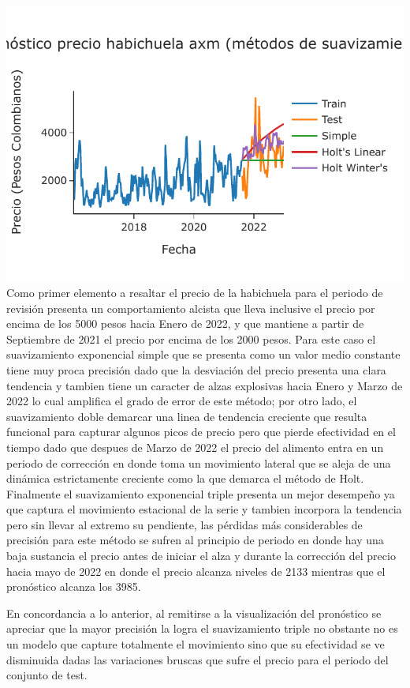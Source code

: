 \documentclass[
]{book}
\begin{document}
\includegraphics{bookdown-demo_files/figure-latex/unnamed-chunk-136-123.pdf}
Como primer elemento a resaltar el precio de la habichuela para el periodo de revisión presenta un comportamiento alcista que lleva inclusive el precio por encima de los 5000 pesos hacia Enero de 2022, y que mantiene a partir de Septiembre de 2021 el precio por encima de los 2000 pesos. Para este caso el suavizamiento exponencial simple que se presenta como un valor medio constante tiene muy proca precisión dado que la desviación del precio presenta una clara tendencia y tambien tiene un caracter de alzas explosivas hacia Enero y Marzo de 2022 lo cual amplifica el grado de error de este método; por otro lado, el suavizamiento doble demarcar una linea de tendencia creciente que resulta funcional para capturar algunos picos de precio pero que pierde efectividad en el tiempo dado que despues de Marzo de 2022 el precio del alimento entra en un periodo de corrección en donde toma un movimiento lateral que se aleja de una dinámica estrictamente creciente como la que demarca el método de Holt. Finalmente el suavizamiento exponencial triple presenta un mejor desempeño ya que captura el movimiento estacional de la serie y tambien incorpora la tendencia pero sin llevar al extremo su pendiente, las pérdidas más considerables de precisión para este método se sufren al principio de periodo en donde hay una baja sustancia el precio antes de iniciar el alza y durante la corrección del precio hacia mayo de 2022 en donde el precio alcanza niveles de 2133 mientras que el pronóstico alcanza los 3985.

En concordancia a lo anterior, al remitirse a la visualización del pronóstico se apreciar que la mayor precisión la logra el suavizamiento triple no obstante no es un modelo que capture totalmente el movimiento sino que su efectividad se ve disminuida dadas las variaciones bruscas que sufre el precio para el periodo del conjunto de test.
\end{document}
